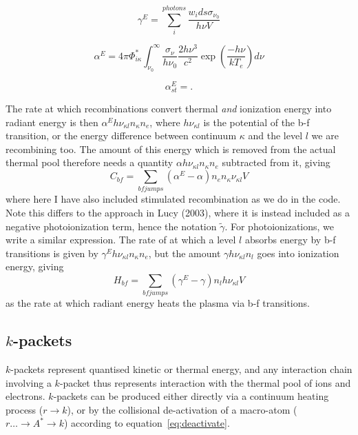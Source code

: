 \begin{equation}
\gamma^E = \sum_i^{photons} \frac{w_i ds \sigma_{\nu_0}}{h \nu V}
\end{equation}

\begin{equation}
\alpha^E = 4\pi \Phi^*_{i\kappa} \int^\infty_{\nu_0} 
\frac{\sigma_\nu}{h \nu_0} \frac{2 h \nu^3}{c^2} 
\exp \left( \frac{- h \nu}{k T_e} \right) d\nu
\end{equation}

\begin{equation}
\alpha^E_{st} = .
\end{equation}

The rate at which recombinations convert
thermal {\em and} ionization energy into radiant energy is then
$\alpha^E h\nu_{\kappa l} n_\kappa n_e$, where $h \nu_{\kappa l}$ is the potential of the 
b-f transition, or the energy difference between continuum $\kappa$ and 
the level $l$ we are recombining too. 
The amount of this energy which is removed from the actual thermal pool
therefore needs a quantity $\alpha h\nu_{\kappa l} n_\kappa n_e$ subtracted from it,
giving
\begin{equation}
C_{bf} = \sum_{bf jumps} (\alpha^E - \alpha) n_e n_{\kappa}\nu_{\kappa l} V 
\end{equation}
where here I have also included stimulated recombination as we do in the code. Note
this differs to the approach in Lucy (2003), where it is instead included as a 
negative photoionization term, hence the notation $\widetilde{\gamma}$.
For photoionizations, we write a similar expression. The rate of at which
a level $l$ absorbs energy by b-f transitions is given by $\gamma^E h\nu_{\kappa l} n_\kappa n_e$,
but the amount $\gamma h \nu_{\kappa l} n_l$ goes into ionization energy, giving 
\begin{equation}
H_{bf} = \sum_{bf jumps} (\gamma^E - \gamma) n_l h \nu_{\kappa l} V
\end{equation}
as the rate at which radiant energy heats the plasma via b-f transitions.

\subsection{$k$-packets}
$k$-packets represent quantised kinetic or thermal energy, and any interaction
chain involving a $k$-packet thus represents interaction with the thermal
pool of ions and electrons. $k$-packets can be produced either directly
via a continuum heating process ($r \rightarrow k$), 
or by the collisional de-activation of a macro-atom 
($r \ldots \rightarrow A^* \rightarrow k$) according to equation~\ref{eq:deactivate}. 

